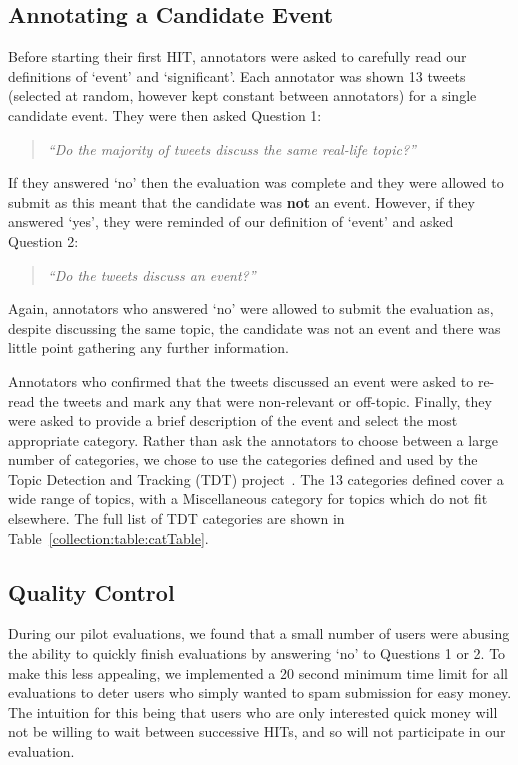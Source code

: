 \subsection{Annotating a Candidate Event}
\label{collection:sec:annotation}
Before starting their first HIT, annotators were asked to carefully read our definitions of `event' and `significant'.
Each annotator was shown 13 tweets (selected at random, however kept constant between annotators) for a single candidate event.
They were then asked Question 1:
\begin{quote}\emph{``Do the majority of tweets discuss the same real-life topic?''}
\end{quote}
If they answered `no' then the evaluation was complete and they were allowed to submit as this meant that the candidate was \textbf{not} an event.
However, if they answered `yes', they were reminded of our definition of `event' and asked Question 2:
\begin{quote}
\emph{``Do the tweets discuss an event?''}
\end{quote}
Again, annotators who answered `no' were allowed to submit the evaluation as, despite discussing the same topic, the candidate was not an event and there was little point gathering any further information.

Annotators who confirmed that the tweets discussed an event were asked to re-read the tweets and mark any that were non-relevant or off-topic.
Finally, they were asked to provide a brief description of the event and select the most appropriate category.
Rather than ask the annotators to choose between a large number of categories, we chose to use the categories defined and used by the Topic Detection and Tracking (TDT) project~\citep{Allan:2002:ITD:772260.772262}.
The 13 categories defined cover a wide range of topics, with a Miscellaneous category for topics which do not fit elsewhere.
The full list of TDT categories are shown in Table~\ref{collection:table:catTable}.

\subsection{Quality Control}
\label{sec:spam}
During our pilot evaluations, we found that a small number of users were abusing the ability to quickly finish evaluations by answering `no' to Questions 1 or 2.
To make this less appealing, we implemented a 20 second minimum time limit for all evaluations to deter users who simply wanted to spam submission for easy money.
The intuition for this being that users who are only interested quick money will not be willing to wait between successive HITs, and so will not participate in our evaluation.

